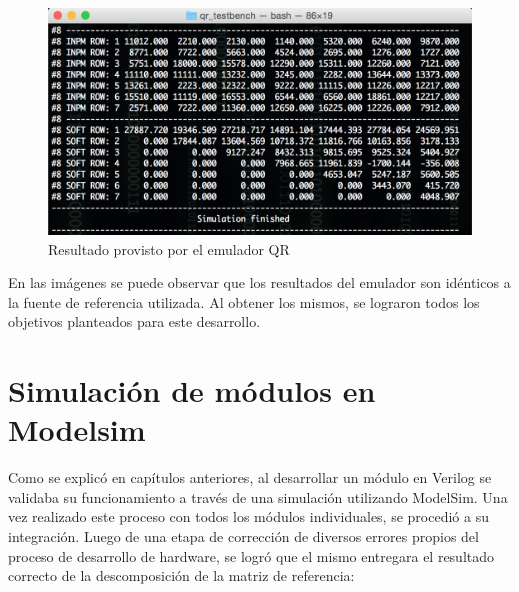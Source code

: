 \begin{figure}[h!]
  \begin{center}
    \includegraphics[width=15cm]{./figures/C05-sample_qr_emulator}
    \caption{Resultado provisto por el emulador QR}
    \label{fig:testbench_vs_bluebit2}
  \end{center}
\end{figure}

En las imágenes se puede observar que los resultados del emulador son idénticos a la fuente de referencia utilizada. Al obtener los mismos, se lograron todos los objetivos planteados para este desarrollo.

\newpage

\section{Simulación de módulos en Modelsim}

Como se explicó en capítulos anteriores, al desarrollar un módulo en Verilog se validaba su funcionamiento a través de una simulación utilizando ModelSim. Una vez realizado este proceso con todos los módulos individuales, se procedió a su integración. Luego de una etapa de corrección de diversos errores propios del proceso de desarrollo de hardware, se logró que el mismo entregara el resultado correcto de la descomposición de la matriz de referencia:

